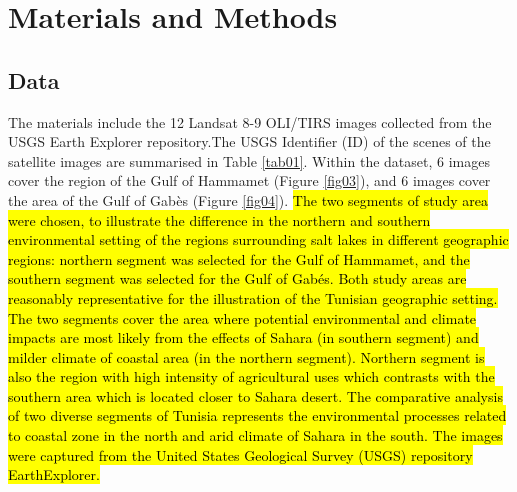 \documentclass[land,article,submit,pdftex,moreauthors]{Definitions/mdpi}
\begin{document}
\section{Materials and Methods}

\subsection{Data}

The materials include the 12 Landsat 8-9 OLI/TIRS images collected from the USGS Earth Explorer repository.The USGS Identifier (ID) of the scenes of the satellite images are summarised in Table \ref{tab01}. Within the dataset, 6 images cover the region of the Gulf of Hammamet (Figure \ref{fig03}), and 6 images cover the area of the Gulf of Gabès (Figure \ref{fig04}). \hl{The two segments of study area were chosen, to illustrate the difference in the northern and southern environmental setting of the regions surrounding salt lakes in different geographic regions: northern segment was selected for the Gulf of Hammamet, and the southern segment was selected for the Gulf of Gab\'es. Both study areas are reasonably representative for the illustration of the Tunisian geographic setting. The two segments cover the area where potential environmental and climate impacts are most likely from the effects of Sahara (in southern segment) and milder climate of coastal area (in the northern segment). Northern segment is also the region with high intensity of agricultural uses which contrasts with the southern area which is located closer to Sahara desert. The comparative analysis of two diverse segments of Tunisia represents the environmental processes related to coastal zone in the north and arid climate of Sahara in the south. The images were captured from the United States Geological Survey (USGS) repository EarthExplorer.}
\end{document}

